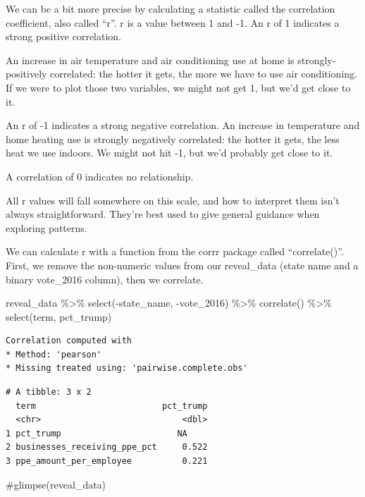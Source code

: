 \documentclass[
  letterpaper,
  DIV=11,
  numbers=noendperiod]{scrreprt}
\newenvironment{Shaded}{\begin{snugshade}}{\end{snugshade}}
\newcommand{\CommentTok}[1]{\textcolor[rgb]{0.37,0.37,0.37}{#1}}
\newcommand{\FunctionTok}[1]{\textcolor[rgb]{0.28,0.35,0.67}{#1}}
\newcommand{\NormalTok}[1]{\textcolor[rgb]{0.00,0.23,0.31}{#1}}
\newcommand{\SpecialCharTok}[1]{\textcolor[rgb]{0.37,0.37,0.37}{#1}}
\begin{document}
We can be a bit more precise by calculating a statistic called the
correlation coefficient, also called ``r''. r is a value between 1 and
-1. An r of 1 indicates a strong positive correlation.

An increase in air temperature and air conditioning use at home is
strongly-positively correlated: the hotter it gets, the more we have to
use air conditioning. If we were to plot those two variables, we might
not get 1, but we'd get close to it.

An r of -1 indicates a strong negative correlation. An increase in
temperature and home heating use is strongly negatively correlated: the
hotter it gets, the less heat we use indoors. We might not hit -1, but
we'd probably get close to it.

A correlation of 0 indicates no relationship.

All r values will fall somewhere on this scale, and how to interpret
them isn't always straightforward. They're best used to give general
guidance when exploring patterns.

We can calculate r with a function from the corrr package called
``correlate()''. First, we remove the non-numeric values from our
reveal\_data (state name and a binary vote\_2016 column), then we
correlate.

\begin{Shaded}
\begin{Highlighting}[]
\NormalTok{reveal\_data }\SpecialCharTok{\%\textgreater{}\%}
  \FunctionTok{select}\NormalTok{(}\SpecialCharTok{{-}}\NormalTok{state\_name, }\SpecialCharTok{{-}}\NormalTok{vote\_2016) }\SpecialCharTok{\%\textgreater{}\%}
  \FunctionTok{correlate}\NormalTok{() }\SpecialCharTok{\%\textgreater{}\%}
  \FunctionTok{select}\NormalTok{(term, pct\_trump)}
\end{Highlighting}
\end{Shaded}

\begin{verbatim}
Correlation computed with
* Method: 'pearson'
* Missing treated using: 'pairwise.complete.obs'
\end{verbatim}

\begin{verbatim}
# A tibble: 3 x 2
  term                         pct_trump
  <chr>                            <dbl>
1 pct_trump                       NA    
2 businesses_receiving_ppe_pct     0.522
3 ppe_amount_per_employee          0.221
\end{verbatim}

\begin{Shaded}
\begin{Highlighting}[]
\CommentTok{\#glimpse(reveal\_data)}
\end{Highlighting}
\end{Shaded}
\end{document}
